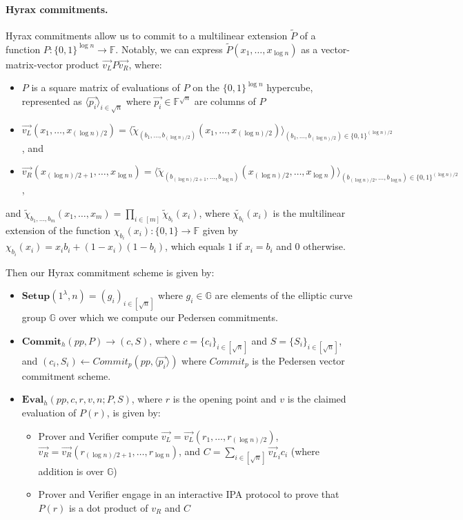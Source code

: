 \paragraph{Hyrax commitments.}
Hyrax commitments \cite{SP:WTSTW18} allow us to commit to a multilinear extension $\widetilde{P}$ of a function $P:\{0,1\}^{\log n} \rightarrow \mathbb{F}$. 
Notably, we can express $\widetilde{P}(x_1, \dots, x_{\log n})$ as a vector-matrix-vector product $\vec{v_L} P \vec{v_R}$, where:
\begin{itemize}
    \item $P$ is a square matrix of evaluations of $P$ on the $\{0,1\}^{\log n}$ hypercube, represented as $\langle \vec{p_i}\rangle_{i \in \sqrt{n}}$ where $\vec{p_i} \in \mathbb{F}^{\sqrt{n}}$ are columns of $P$
    \item $\vec{v_L}(x_1, \dots, x_{(\log n)/2}) = \langle \widetilde{\chi}_{(b_1, \dots, b_{(\log n)/2})}(x_1, \dots, x_{(\log n)/2})\rangle _{(b_1, \dots, b_{(\log n)/2})\in \{0,1\}^{(\log n)/2}}$, and 
    \item $\vec{v_R}(x_{(\log n)/2+1}, \dots, x_{\log n}) = \langle \widetilde{\chi}_{(b_{(\log n)/2+1}, \dots, b_{\log n})}(x_{(\log n)/2}, \dots, x_{\log n})\rangle_{(b_{(\log n)/2}, \dots, b_{\log n}) \in \{0,1\}^{(\log n)/2}}$,
\end{itemize}
and $\widetilde{\chi}_{b_1, \dots, b_m} (x_1, \dots, x_m) = \prod_{i \in [m]} \widetilde{\chi}_{b_i}(x_i)$, where
$\widetilde{\chi_{b_i}}(x_i)$ is the multilinear extension of the function $\chi_{b_i}(x_i): \{0,1\} \rightarrow \mathbb{F}$ given by $\chi_{b_i}(x_i) = x_ib_i + (1-x_i)(1-b_i)$, which equals $1$ if $x_i = b_i$ and $0$ otherwise.

Then our Hyrax commitment scheme is given by:
\begin{itemize}
    \item $\textbf{Setup}(1^{\lambda}, n) = (g_i)_{i \in [\sqrt n]}$ where $g_i \in \mathbb{G}$ are elements of the elliptic curve group $\mathbb{G}$ over which we compute our Pedersen commitments.
    \item $\textbf{Commit}_h(pp, P) \rightarrow (c,S)$, where 
    $c = \{c_i\}_{i \in [\sqrt{n}]}$ and $S = \{S_i\}_{i \in [\sqrt{n}]}$, and
    $(c_i, S_i) \leftarrow Commit_p(pp, \langle \vec{p_i} \rangle)$
    where $Commit_p$ is the Pedersen vector commitment scheme.
    \item $\textbf{Eval}_h(pp, c, r, v, n; P, S)$, where $r$ is the opening point and $v$ is the claimed evaluation of $P(r)$, is given by:
    \begin{itemize}
        \item Prover and Verifier compute $\vec{v_L} = \vec{v_L}(r_1, \dots, r_{(\log n)/2})$, $\vec{v_R} = \vec{v_R}(r_{(\log n)/2+1}, \dots, r_{\log n})$, 
    and $C = \sum_{i \in [\sqrt{n}]} \vec{v_L}_i c_i$ (where addition is over $\mathbb{G}$)
        \item Prover and Verifier engage in an interactive IPA protocol to prove that $P(r)$ is a dot product of $v_R$ and $C$ 
    \end{itemize} 
\end{itemize} 

